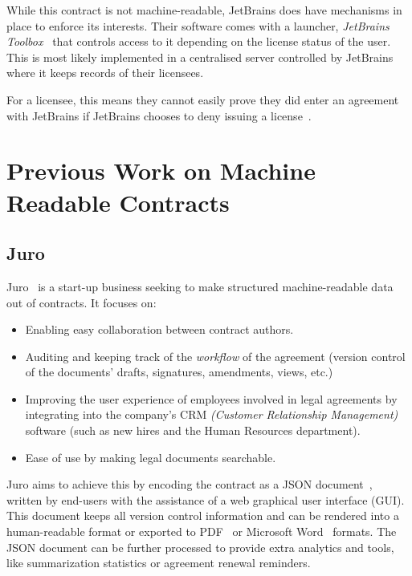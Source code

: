 While this contract is not machine-readable, JetBrains does have mechanisms in place to enforce its interests.
Their software comes with a launcher, \textit{JetBrains Toolbox}~\cite{jetbrainsToolbox} that controls access to it
depending on the license status of the user.
This is most likely implemented in a centralised server controlled by JetBrains where it keeps records
of their licensees.

For a licensee, this means they cannot easily prove they did enter an agreement with JetBrains if JetBrains chooses
to deny issuing a license~\citeTODO.


\section{Previous Work on Machine Readable Contracts}\label{sec:machine-readable-contracts}

\subsection{Juro}\label{subsec:juro}
Juro~\cite{juroWhitepaper} is a start-up business seeking to make structured machine-readable data out of contracts.
It focuses on:
\begin{itemize}
    \item Enabling easy collaboration between contract authors.
    \item Auditing and keeping track of the \textit{workflow} of the agreement (version control of the documents'
    drafts, signatures, amendments, views, etc.)
    \item Improving the user experience of employees involved in legal agreements by integrating into the company's CRM
    \textit{(Customer Relationship Management)} software (such as new hires and the Human Resources department).
    \item Ease of use by making legal documents searchable.
\end{itemize}

Juro aims to achieve this by encoding the contract as a JSON document~\cite{jsonSpec}, written by end-users
with the assistance of a web graphical user interface (GUI).
This document keeps all version control information and can be rendered into a human-readable format or exported
to PDF~\cite{pdf2020spec} or Microsoft Word~\cite{microsoftWordWeb} formats.
The JSON document can be further processed to provide extra analytics and tools, like summarization statistics or
agreement renewal reminders.\\


